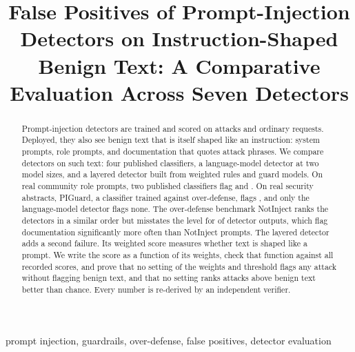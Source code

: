 \documentclass[conference]{IEEEtran}
\begin{document}
\title{False Positives of Prompt-Injection Detectors on Instruction-Shaped Benign
Text: A Comparative Evaluation Across Seven Detectors}

\author{
}

\maketitle

\begin{abstract}
Prompt-injection detectors are trained and scored on attacks and ordinary
requests. Deployed, they also see benign text that is itself shaped like an
instruction: system prompts, role prompts, and documentation that quotes
attack phrases. We compare \NDetectorsCompared{} detectors on such text: four
published classifiers, a language-model detector at two model sizes, and a
layered detector built from weighted rules and guard models. On
\PanDeepsetRealPromptN{} real community role prompts, two published
classifiers flag \PanDeepsetRealPromptK{} and \PanFmopsRealPromptK{}. On
\PanDeepsetRealDocN{} real security abstracts, PIGuard, a classifier trained
against over-defense, flags \PanPiguardRealDocK{}, and only the language-model
detector flags none. The over-defense benchmark NotInject ranks the detectors
in a similar order but misstates the level for \NPanDocHigher{} of
\NPanRanked{} detector outputs, which flag documentation significantly more
often than NotInject prompts. The layered detector adds a second failure.
Its weighted score measures whether text is shaped like a prompt. We write the
score as a function of its weights, check that function against all
\NScoreModelCells{} recorded scores, and prove that no setting of the weights
and threshold flags any attack without flagging benign text, and that no
setting ranks attacks above benign text better than chance. Every number is
re-derived by an independent verifier.
\end{abstract}

\begin{IEEEkeywords}
prompt injection, guardrails, over-defense, false positives, detector
evaluation
\end{IEEEkeywords}
\end{document}
